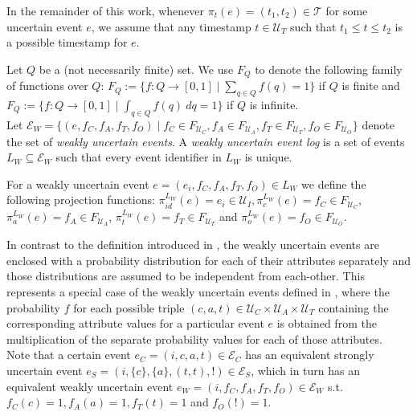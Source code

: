 In the remainder of this work, whenever $\pi_t(e) = (t_1,t_2) \in \mathcal{T}$ for some uncertain event $e$, we assume that any timestamp $t \in \mathcal{U}_T$ such that $t_1 \leq t \leq t_2$ is a possible timestamp for $e$.


\begin{definition} 
Let $Q$ be a (not necessarily finite) set.
We use $F_Q$ to denote the following family of functions over $Q$:
$F_Q := \{f: Q \rightarrow [0,1] \mid
\sum_{q \in Q} f(q) = 1\}$ if $Q$ is finite and 
$F_Q := \{f: Q \rightarrow [0,1] \mid
\int_{q \in Q} f(q) ~ dq = 1\}$ if $Q$ is infinite. \\
Let $\mathcal{E}_W = \{(e,f_C,f_A,f_T,f_O) \mid 
f_C \in F_{\mathcal{U}_C}, f_A \in F_{\mathcal{U}_A}, f_T \in F_{\mathcal{U}_T}, f_O \in F_{\mathcal{U}_O} \}$
denote the set of \emph{weakly uncertain events}.
A \emph{weakly uncertain event log} is a set of events $L_W \subseteq \mathcal{E}_W$ such that every event identifier in $L_W$ is unique.

For a weakly uncertain event $e=(e_i,f_C,f_A,f_T,f_O) \in L_W$ we define the following projection functions:
$\pi_{id}^{L_W}(e)=e_i \in \mathcal{U}_I, 
\pi_c^{L_W}(e)=f_C \in F_{\mathcal{U}_C}$, 
$\pi_a^{L_W}(e)=f_A \in F_{\mathcal{U}_A}$, 
$\pi_t^{L_W}(e)=f_T \in F_{\mathcal{U}_T}$ and 
$\pi^{L_W}_o(e)=f_O \in F_{\mathcal{U}_O}$. 
\end{definition}


In contrast to the definition introduced in \cite{mining}, the weakly uncertain events are enclosed with a probability distribution for each of their attributes separately and those distributions are assumed to be independent from each-other.
This represents a special case of the weakly uncertain events defined in \cite{mining}, where the probability $f$ for each possible triple $(c,a,t) \in \mathcal{U}_C \times \mathcal{U}_A \times \mathcal{U}_T$ containing the corresponding attribute values for a particular event $e$ is obtained from the multiplication of the separate probability values for each of those attributes.\\



Note that a certain event $e_C=(i,c,a,t) \in \mathcal{E}_C$ has an equivalent strongly uncertain event $e_S=(i,\{c\},\{a\},(t,t),!) \in \mathcal{E}_S$, which in turn has an equivalent weakly uncertain event 
$e_W=(i,f_C,f_A,f_T,f_O) \in \mathcal{E}_W$ s.t. $f_C(c)=1, f_A(a)=1, f_T(t)=1$ and $f_O(!)=1$.

